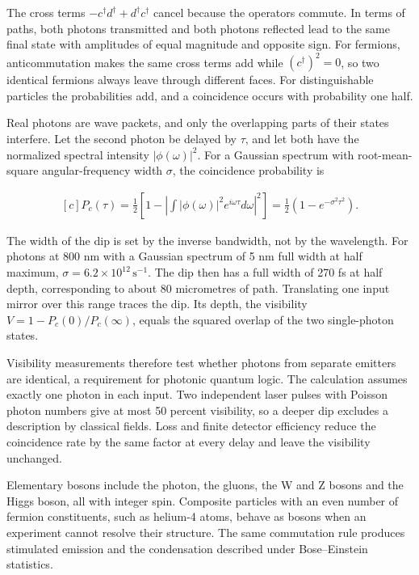 \documentclass[11pt,oneside]{book}
\newenvironment{centeredalign}{\[\begin{gathered}[c]}{\end{gathered}\]}
\begin{document}
The cross terms \(-c^\dagger d^\dagger+d^\dagger c^\dagger\) cancel because the operators commute. In terms of paths, both photons transmitted and both photons reflected lead to the same final state with amplitudes of equal magnitude and opposite sign. For fermions, anticommutation makes the same cross terms add while \((c^\dagger)^2=0\), so two identical fermions always leave through different faces. For distinguishable particles the probabilities add, and a coincidence occurs with probability one half.

Real photons are wave packets, and only the overlapping parts of their states interfere. Let the second photon be delayed by \(\tau\), and let both have the normalized spectral intensity \(|\phi(\omega)|^2\). For a Gaussian spectrum with root-mean-square angular-frequency width \(\sigma\), the coincidence probability is

\begin{centeredalign}
P_c(\tau)=\frac12\left[1-\left|\int|\phi(\omega)|^2e^{i\omega\tau}d\omega\right|^2\right]
=\frac12\left(1-e^{-\sigma^2\tau^2}\right).
\end{centeredalign}

The width of the dip is set by the inverse bandwidth, not by the wavelength. For photons at 800 nm with a Gaussian spectrum of 5 nm full width at half maximum, \(\sigma=6.2\times10^{12}\,\mathrm{s^{-1}}\). The dip then has a full width of 270 fs at half depth, corresponding to about 80 micrometres of path. Translating one input mirror over this range traces the dip. Its depth, the visibility \(V=1-P_c(0)/P_c(\infty)\), equals the squared overlap of the two single-photon states.

Visibility measurements therefore test whether photons from separate emitters are identical, a requirement for photonic quantum logic. The calculation assumes exactly one photon in each input. Two independent laser pulses with Poisson photon numbers give at most 50 percent visibility, so a deeper dip excludes a description by classical fields. Loss and finite detector efficiency reduce the coincidence rate by the same factor at every delay and leave the visibility unchanged.

Elementary bosons include the photon, the gluons, the W and Z bosons and the Higgs boson, all with integer spin. Composite particles with an even number of fermion constituents, such as helium-4 atoms, behave as bosons when an experiment cannot resolve their structure. The same commutation rule produces stimulated emission and the condensation described under Bose--Einstein statistics.
\end{document}
